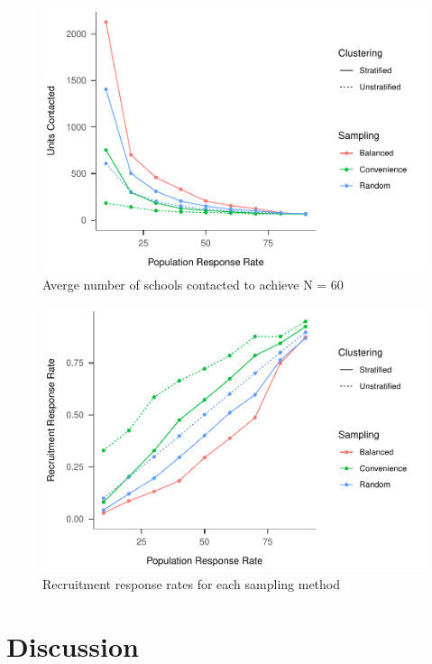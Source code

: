 \documentclass[man,floatsintext]{apa6}
\begin{document}
\begin{figure}
\centering
\includegraphics{GenSamp_Paper_files/figure-latex/fig-units-contacted-1.pdf}
\caption{\label{fig:fig-units-contacted}Averge number of schools contacted to achieve N = 60}
\end{figure}

\begin{figure}
\centering
\includegraphics{GenSamp_Paper_files/figure-latex/fig-response-rates-1.pdf}
\caption{\label{fig:fig-response-rates}Recruitment response rates for each sampling method}
\end{figure}

\newpage

\hypertarget{discussion}{%
\section{Discussion}\label{discussion}}
\end{document}
